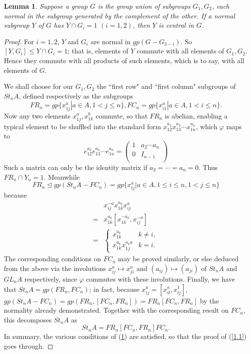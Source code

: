 \documentclass[openany,leqno]{book}  %
\newtheorem{lemma}[theorem]{Lemma}
\begin{document}
\begin{lemma}\label{1.2}
Suppose a group $G$ is the group union of subgroups $G_1,G_2$, each normal in the subgroup generated by the complement of the other. If a normal subgroup $Y$ of $G$ has
$Y\cap G_i=1$ $(i=1,2)$, then $Y$ is central in $G$.

\end{lemma}
\begin{proof}
For $i=1,2$, $Y$ and $G_i$ are normal in $gp(G-G_{3-i})$. So $[Y,G_i]\leqslant Y\cap G_i=1$; that is, elements of $Y$ commute with all elements of $G_1,G_2$. Hence they commute with all products of such elements, which is to say, with all elements of $G$.

We shall choose for our $G_1,G_2$ the ``first row" and ``first column" subgroups of $St_nA$, defined respectively as the subgroups
\[FR_n=gp\{x^a_{1j}|a\in A, 1<j\leqslant n\},FC_n=gp\{x_{i1}^a|a\in A,1<i\leqslant n\}.\]
Now any two elements $x_{1j}^a,x_{1k}^b$ commute, so that $FR_n$ is abelian, enabling a typical element to be shuffled into the standard form $x_{12}^{a_2}x_{13}^{a_3}\cdots x_{1n}^{a_n}$, which $\varphi$ maps to
\[e_{12}^{a_2}e_{13}^{a_3}\cdots e_{1n}^{a_n}=\left(\begin{array}{c|c}
1& a_2\cdots a_n \\
\hline
0&I_{n-1}\\
\end{array}\right) \]
Such a matrix can only be the identity matrix if $a_2=\cdots=a_n=0$. Thus $FR_n\cap Y_n=1$. 
Meanwhile
\[FR_n\trianglelefteq gp(St_nA-FC_n)=gp\{x_{ij}^a|a\in A,1\leqslant i\leqslant n,1<j\leqslant n\}\]
because
\begin{equation*}
\begin{array}{rl}
&x_{ij}^{-a}x_{1k}^{a_k}x_{ij}^a\\
=& x_{1k}^{a_k}[x_{1k}^{-a_k},x_{ij}^{-a}]\\
=&\begin{cases}
x_{1k}^{a_k} &k\neq i,\\
x_{1k}^{a_k}x_{1j}^{a_ka} &k=i.
\end{cases}
\end{array}
\end{equation*}
The corresponding conditions on $FC_n$ may be proved similarly, or else deduced from the above via the involutions $x_{ij}^a\mapsto x_{ji}^a$ and $(a_{ij})\mapsto (a_{ji})$ of $St_nA$ and $GL_nA$ respectively, since $\varphi$ commutes with these involutions. Finally, we have that $St_nA=gp(FR_n,FC_n)$; in fact, because $x_{ij}^a=[x_{il}^a,x_{lj}^1]$, 
$gp(St_nA-FC_n)=gp(FR_n,[FC_n,FR_n])=FR_n[FC_n,FR_n]$ by the normality already demonstrated. Together with the corresponding result on $FC_n$, this decomposes $St_nA$ as
\[St_nA=FR_n[FC_n,FR_n]FC_n.\]
In summary, the various conditions of (\ref{1.2}) are satisfied, so that the proof of (\ref{1.1}) goes through.
\end{proof}
\end{document}
